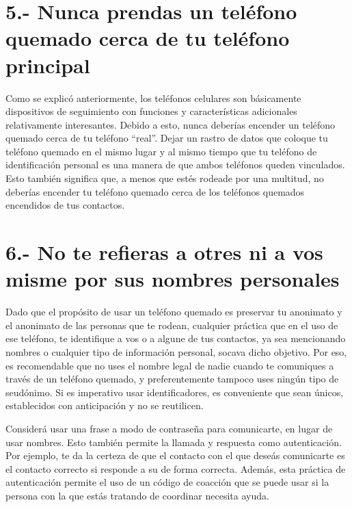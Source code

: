 \documentclass[
]{book}
\begin{document}
\hypertarget{nunca-prendas-un-teluxe9fono-quemado-cerca-de-tu-teluxe9fono-principal}{%
\chapter*{5.- Nunca prendas un teléfono quemado cerca de tu teléfono principal}\label{nunca-prendas-un-teluxe9fono-quemado-cerca-de-tu-teluxe9fono-principal}}

Como se explicó anteriormente, los teléfonos celulares son básicamente dispositivos de seguimiento con funciones y características adicionales relativamente interesantes. Debido a esto, nunca deberías encender un teléfono quemado cerca de tu teléfono ``real''. Dejar un rastro de datos que coloque tu teléfono quemado en el mismo lugar y al mismo tiempo que tu teléfono de identificación personal es una manera de que ambos teléfonos queden vinculados. Esto también significa que, a menos que estés rodeade por una multitud, no deberías encender tu teléfono quemado cerca de los teléfonos quemados encendidos de tus contactos.

\hypertarget{no-te-refieras-a-otres-ni-a-vos-misme-por-sus-nombres-personales}{%
\chapter*{6.- No te refieras a otres ni a vos misme por sus nombres personales}\label{no-te-refieras-a-otres-ni-a-vos-misme-por-sus-nombres-personales}}

Dado que el propósito de usar un teléfono quemado es preservar tu anonimato y el anonimato de las personas que te rodean, cualquier práctica que en el uso de ese teléfono, te identifique a vos o a algune de tus contactos, ya sea mencionando nombres o cualquier tipo de información personal, socava dicho objetivo. Por eso, es recomendable que no uses el nombre legal de nadie cuando te comuniques a través de un teléfono quemado, y preferentemente tampoco uses ningún tipo de seudónimo. Si es imperativo usar identificadores, es conveniente que sean únicos, establecidos con anticipación y no se reutilicen.

Considerá usar una frase a modo de contraseña para comunicarte, en lugar de usar nombres. Esto también permite la llamada y respuesta como autenticación. Por ejemplo, te da la certeza de que el contacto con el que deseás comunicarte es el contacto correcto si responde a su de forma correcta. Además, esta práctica de autenticación permite el uso de un código de coacción que se puede usar si la persona con la que estás tratando de coordinar necesita ayuda.
\end{document}
